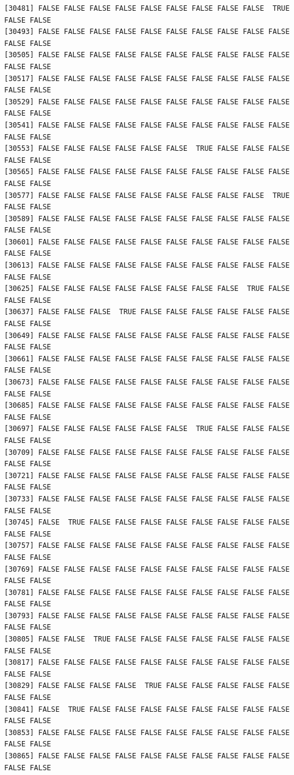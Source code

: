 \documentclass[
  a4paper,
  DIV=11,
  numbers=noendperiod]{scrartcl}
\begin{document}
\begin{verbatim}
[30481] FALSE FALSE FALSE FALSE FALSE FALSE FALSE FALSE FALSE  TRUE FALSE FALSE
[30493] FALSE FALSE FALSE FALSE FALSE FALSE FALSE FALSE FALSE FALSE FALSE FALSE
[30505] FALSE FALSE FALSE FALSE FALSE FALSE FALSE FALSE FALSE FALSE FALSE FALSE
[30517] FALSE FALSE FALSE FALSE FALSE FALSE FALSE FALSE FALSE FALSE FALSE FALSE
[30529] FALSE FALSE FALSE FALSE FALSE FALSE FALSE FALSE FALSE FALSE FALSE FALSE
[30541] FALSE FALSE FALSE FALSE FALSE FALSE FALSE FALSE FALSE FALSE FALSE FALSE
[30553] FALSE FALSE FALSE FALSE FALSE FALSE  TRUE FALSE FALSE FALSE FALSE FALSE
[30565] FALSE FALSE FALSE FALSE FALSE FALSE FALSE FALSE FALSE FALSE FALSE FALSE
[30577] FALSE FALSE FALSE FALSE FALSE FALSE FALSE FALSE FALSE  TRUE FALSE FALSE
[30589] FALSE FALSE FALSE FALSE FALSE FALSE FALSE FALSE FALSE FALSE FALSE FALSE
[30601] FALSE FALSE FALSE FALSE FALSE FALSE FALSE FALSE FALSE FALSE FALSE FALSE
[30613] FALSE FALSE FALSE FALSE FALSE FALSE FALSE FALSE FALSE FALSE FALSE FALSE
[30625] FALSE FALSE FALSE FALSE FALSE FALSE FALSE FALSE  TRUE FALSE FALSE FALSE
[30637] FALSE FALSE FALSE  TRUE FALSE FALSE FALSE FALSE FALSE FALSE FALSE FALSE
[30649] FALSE FALSE FALSE FALSE FALSE FALSE FALSE FALSE FALSE FALSE FALSE FALSE
[30661] FALSE FALSE FALSE FALSE FALSE FALSE FALSE FALSE FALSE FALSE FALSE FALSE
[30673] FALSE FALSE FALSE FALSE FALSE FALSE FALSE FALSE FALSE FALSE FALSE FALSE
[30685] FALSE FALSE FALSE FALSE FALSE FALSE FALSE FALSE FALSE FALSE FALSE FALSE
[30697] FALSE FALSE FALSE FALSE FALSE FALSE  TRUE FALSE FALSE FALSE FALSE FALSE
[30709] FALSE FALSE FALSE FALSE FALSE FALSE FALSE FALSE FALSE FALSE FALSE FALSE
[30721] FALSE FALSE FALSE FALSE FALSE FALSE FALSE FALSE FALSE FALSE FALSE FALSE
[30733] FALSE FALSE FALSE FALSE FALSE FALSE FALSE FALSE FALSE FALSE FALSE FALSE
[30745] FALSE  TRUE FALSE FALSE FALSE FALSE FALSE FALSE FALSE FALSE FALSE FALSE
[30757] FALSE FALSE FALSE FALSE FALSE FALSE FALSE FALSE FALSE FALSE FALSE FALSE
[30769] FALSE FALSE FALSE FALSE FALSE FALSE FALSE FALSE FALSE FALSE FALSE FALSE
[30781] FALSE FALSE FALSE FALSE FALSE FALSE FALSE FALSE FALSE FALSE FALSE FALSE
[30793] FALSE FALSE FALSE FALSE FALSE FALSE FALSE FALSE FALSE FALSE FALSE FALSE
[30805] FALSE FALSE  TRUE FALSE FALSE FALSE FALSE FALSE FALSE FALSE FALSE FALSE
[30817] FALSE FALSE FALSE FALSE FALSE FALSE FALSE FALSE FALSE FALSE FALSE FALSE
[30829] FALSE FALSE FALSE FALSE  TRUE FALSE FALSE FALSE FALSE FALSE FALSE FALSE
[30841] FALSE  TRUE FALSE FALSE FALSE FALSE FALSE FALSE FALSE FALSE FALSE FALSE
[30853] FALSE FALSE FALSE FALSE FALSE FALSE FALSE FALSE FALSE FALSE FALSE FALSE
[30865] FALSE FALSE FALSE FALSE FALSE FALSE FALSE FALSE FALSE FALSE FALSE FALSE

\end{verbatim}
\end{document}
